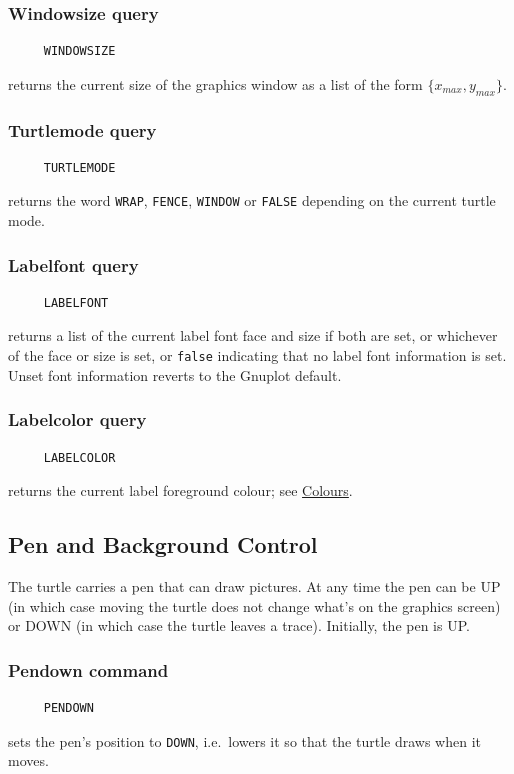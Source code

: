 \subsubsection*{Windowsize query}
\begin{verbatim}
     WINDOWSIZE
\end{verbatim}
returns the current size of the graphics window as a list of the form
$\{x_{max},y_{max}\}$.

\subsubsection*{Turtlemode query}
\begin{verbatim}
     TURTLEMODE
\end{verbatim}
returns the word \texttt{WRAP}, \texttt{FENCE}, \texttt{WINDOW} or
\texttt{FALSE} depending on the current turtle mode.

\hypertarget{logoturtle:labelfont}{\subsubsection*{Labelfont query}}
\begin{verbatim}
     LABELFONT
\end{verbatim}
returns a list of the current label font face and size if both are
set, or whichever of the face or size is set, or \texttt{false}
indicating that no label font information is set.  Unset font
information reverts to the Gnuplot default.

\subsubsection*{Labelcolor query}
\begin{verbatim}
     LABELCOLOR
\end{verbatim}
returns the current label foreground colour; see
\hyperref[logoturtle:Colours]{Colours}.


\subsection{Pen and Background Control}
\label{logoturtle:PBC}

The turtle carries a pen that can draw pictures.  At any time the pen
can be UP (in which case moving the turtle does not change what's on the
graphics screen) or DOWN (in which case the turtle leaves a trace).
Initially, the pen is UP.

\subsubsection*{Pendown command}
\begin{verbatim}
     PENDOWN
\end{verbatim}
sets the pen's position to \texttt{DOWN}, i.e.\ lowers it so that the
turtle draws when it moves.

